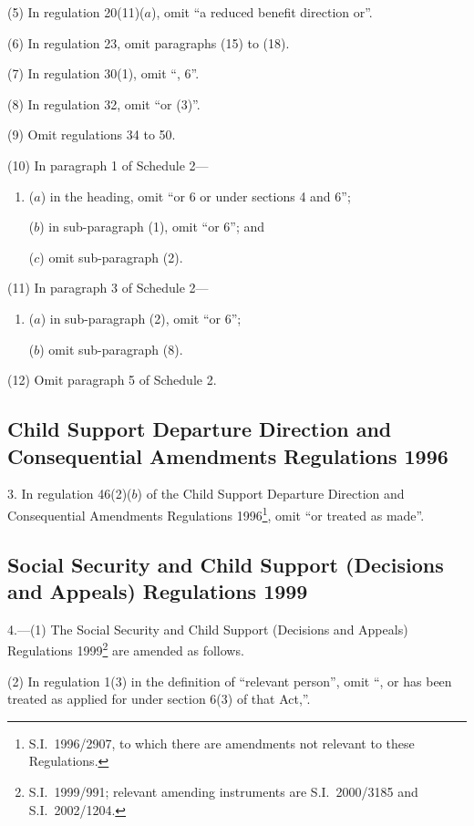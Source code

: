 \documentclass[12pt,a4paper]{article}
\begin{document}
(5) In regulation 20(11)($a$), omit “a reduced benefit direction or”.

(6) In regulation 23, omit paragraphs (15) to (18).

(7) In regulation 30(1), omit “, 6”.

(8) In regulation 32, omit “or (3)”.

(9) Omit regulations 34 to 50.

(10) In paragraph 1 of Schedule 2—
\begin{enumerate}\item[]
($a$) in the heading, omit “or 6 or under sections 4 and 6”;

($b$) in sub-paragraph (1), omit “or 6”; and

($c$) omit sub-paragraph (2).
\end{enumerate}

(11) In paragraph 3 of Schedule 2—
\begin{enumerate}\item[]
($a$) in sub-paragraph (2), omit “or 6”;

($b$) omit sub-paragraph (8).
\end{enumerate}

(12) Omit paragraph 5 of Schedule 2.

\subsection[3. Child Support Departure Direction and Consequential Amendments Regulations 1996]{Child Support Departure Direction and Consequential Amendments Regulations 1996}

3.  In regulation 46(2)($b$)  of the Child Support Departure Direction and Consequential Amendments Regulations 1996\footnote{S.I.~1996/2907, to which there are amendments not relevant to these Regulations.}, omit “or treated as made”.

\subsection[4. Social Security and Child Support (Decisions and Appeals) Regulations 1999]{Social Security and Child Support (Decisions and Appeals) Regulations 1999}

4.---(1)  The Social Security and Child Support (Decisions and Appeals) Regulations 1999\footnote{S.I.~1999/991; relevant amending instruments are S.I.~2000/3185 and S.I.~2002/1204.} are amended as follows.

(2) In regulation 1(3) in the definition of “relevant person”, omit “, or has been treated as applied for under section 6(3) of that Act,”.
\end{document}
